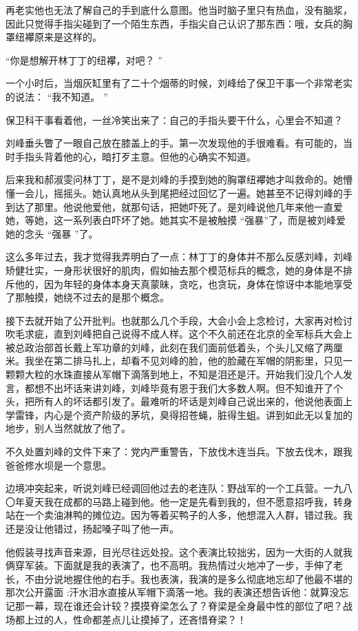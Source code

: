 \documentclass[12pt,twoside,openany]{book}
\begin{document}
再老实他也无法了解自己的手到底什么意图。他当时脑子里只有热血，没有脑浆，因此只觉得手指尖碰到了一个陌生东西，手指尖自己认识了那东西：哦，女兵的胸罩纽襻原来是这样的。

“你是想解开林丁丁的纽襻，对吧？ ”

一个小时后，当烟灰缸里有了二十个烟蒂的时候，刘峰给了保卫干事一个非常老实的说法： “我不知道。 ”

保卫科干事看着他，一丝冷笑出来了：自己的手指头要干什么，心里会不知道？

刘峰垂头瞥了一眼自己放在膝盖上的手。第一次发现他的手很难看。有可能的，当时手指头背着他的心，暗打歹主意。但他的心确实不知道。

后来我和郝淑雯问林丁丁，是不是刘峰的手摸到她的胸罩纽襻她才叫救命的。她懵懂一会儿，摇摇头。她认真地从头到尾把经过回忆了一遍。她甚至不记得刘峰的手到达了那里。他说他爱他，就那句话，把她吓死了。是刘峰说他几年来他一直爱她，等她，这一系列表白吓坏了她。她其实不是被触摸 “强暴”了，而是被刘峰爱她的念头 “强暴 ”了。

这么多年过去，我才觉得我弄明白了一点：林丁丁的身体并不那么反感刘峰，刘峰矫健壮实，一身形状很好的肌肉，假如抽去那个模范标兵的概念，她的身体是不排斥他的，因为年轻的身体本身天真蒙昧，贪吃，也贪玩，身体在惊讶中本能地享受了那触摸，她绕不过去的是那个概念。

接下去就开始了公开批判。也就那么几个手段，大会小会上念检讨，大家再对检讨吹毛求疵，直到刘峰把自己说得不成人样。这个不久前还在北京的全军标兵大会上被总政治部首长戴上军功章的刘峰，此刻在我们面前低着头，个头儿又缩了两厘米。我坐在第二排马扎上，却看不见刘峰的脸，他的脸藏在军帽的阴影里，只见一颗颗大粒的水珠直接从军帽下滴落到地上，不知是泪还是汗。开始我们没几个人发言，都想不出坏话来讲刘峰，刘峰毕竟有恩于我们大多数人啊。但不知谁开了个头，把所有人的坏话都引发了。最难听的坏话是刘峰自己说出来的，他说他表面上学雷锋，内心是个资产阶级的茅坑，臭得招苍蝇，脏得生蛆。讲到如此无以复加的地步，别人当然就放了他了。

不久处置刘峰的文件下来了：党内严重警告，下放伐木连当兵。下放去伐木，跟我爸爸修水坝是一个意思。

边境冲突起来，听说刘峰已经调回他过去的老连队：野战军的一个工兵营。一九八〇年夏天我在成都的马路上碰到他。他一定是先看到我的，但不愿意招呼我，转身站在一个卖油淋鸭的摊位边。因为等着买鸭子的人多，他想混入人群，错过我。我还是没让他错过，扬起嗓子叫了他一声。

他假装寻找声音来源，目光尽往远处投。这个表演比较拙劣，因为一大街的人就我俩穿军装。下面就是我的表演了，也不高明。我热情过火地冲了一步，手伸了老长，不由分说地握住他的右手。我也表演，我演的是多么彻底地忘却了他最不堪的那次公开露面 :汗水泪水直接从军帽下滴落一地。我的表演还想告诉他：就算没忘记那一幕，现在谁还会计较？摸摸脊梁怎么了？脊梁是全身最中性的部位了吧？战场都上过的人，性命都差点儿让摸掉了，还吝惜脊梁？！
\end{document}
